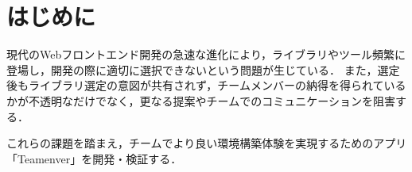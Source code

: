 \documentclass[main]{subfiles}
\begin{document}
\section{はじめに }
現代のWebフロントエンド開発の急速な進化により，ライブラリやツール頻繁に登場し，開発の際に適切に選択できないという問題が生じている\cite{medium.com}．
また，選定後もライブラリ選定の意図が共有されず，チームメンバーの納得を得られているかが不透明なだけでなく，更なる提案やチームでのコミュニケーションを阻害する．

これらの課題を踏まえ，チームでより良い環境構築体験を実現するためのアプリ「Teamenver」を開発・検証する．
\end{document}
